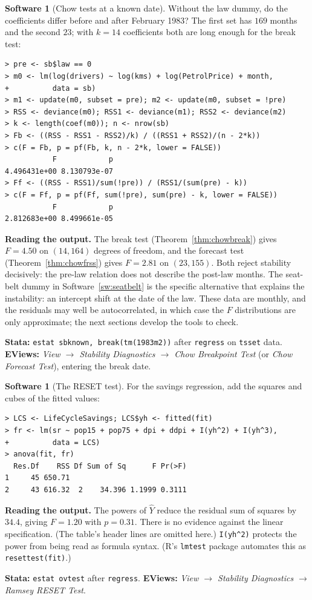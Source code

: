 \documentclass[11pt,a4paper]{article}
\numberwithin{equation}{section}
\theoremstyle{definition}
\newtheorem{software}[thm]{Software}
\begin{document}
\begin{software}[Chow tests at a known date]
\label{sw:chow}
Without the law dummy, do the coefficients differ before and after February 1983? The first set has $169$ months and the second $23$; with
$k = 14$ coefficients both are long enough for the break test:
{\small\begin{verbatim}
> pre <- sb$law == 0
> m0 <- lm(log(drivers) ~ log(kms) + log(PetrolPrice) + month,
+          data = sb)
> m1 <- update(m0, subset = pre); m2 <- update(m0, subset = !pre)
> RSS <- deviance(m0); RSS1 <- deviance(m1); RSS2 <- deviance(m2)
> k <- length(coef(m0)); n <- nrow(sb)
> Fb <- ((RSS - RSS1 - RSS2)/k) / ((RSS1 + RSS2)/(n - 2*k))
> c(F = Fb, p = pf(Fb, k, n - 2*k, lower = FALSE))
           F            p
4.496431e+00 8.130793e-07
> Ff <- ((RSS - RSS1)/sum(!pre)) / (RSS1/(sum(pre) - k))
> c(F = Ff, p = pf(Ff, sum(!pre), sum(pre) - k, lower = FALSE))
           F            p
2.812683e+00 8.499661e-05
\end{verbatim}}
\textbf{Reading the output.} The break test (Theorem~\ref{thm:chowbreak}) gives $F = 4.50$ on $(14, 164)$ degrees of freedom, and the forecast test
(Theorem~\ref{thm:chowfrss}) gives $F = 2.81$ on $(23, 155)$. Both reject stability decisively: the pre-law relation does not describe the post-law months. The
seat-belt dummy in Software~\ref{sw:seatbelt} is the specific alternative that explains the instability: an intercept shift at the date of the law.
These data are monthly, and the residuals may well be autocorrelated, in which case the $F$ distributions are only approximate; the next sections
develop the tools to check.

\textbf{Stata:} \texttt{estat sbknown, break(tm(1983m2))} after \texttt{regress} on \texttt{tsset} data. \textbf{EViews:} \emph{View $\to$ Stability
Diagnostics $\to$ Chow Breakpoint Test} (or \emph{Chow Forecast Test}), entering the break date.
\end{software}

\begin{software}[The RESET test]
\label{sw:reset}
For the savings regression, add the squares and cubes of the fitted values:
{\small\begin{verbatim}
> LCS <- LifeCycleSavings; LCS$yh <- fitted(fit)
> fr <- lm(sr ~ pop15 + pop75 + dpi + ddpi + I(yh^2) + I(yh^3),
+          data = LCS)
> anova(fit, fr)
  Res.Df    RSS Df Sum of Sq      F Pr(>F)
1     45 650.71
2     43 616.32  2    34.396 1.1999 0.3111
\end{verbatim}}
\textbf{Reading the output.} The powers of $\hat Y$ reduce the residual sum of squares by $34.4$, giving $F = 1.20$ with $p = 0.31$. There is no evidence
against the linear specification. (The table's header lines are omitted here.) \texttt{I(yh\textasciicircum2)} protects the power from being read as formula syntax. (R's \texttt{lmtest} package automates
this as \texttt{resettest(fit)}.)

\textbf{Stata:} \texttt{estat ovtest} after \texttt{regress}. \textbf{EViews:} \emph{View $\to$ Stability Diagnostics $\to$ Ramsey RESET Test}.
\end{software}
\end{document}
